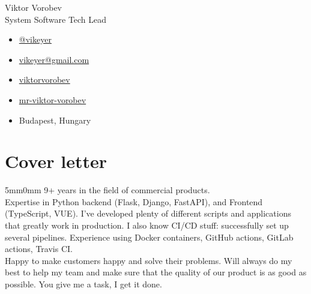 \documentclass[10pt]{article}
\newcommand{\lmvalue}{5mm}
\newcommand{\rmvalue}{0mm}
\begin{document}
\begin{minipage}[b]{0.78\linewidth}
	{\fontsize{28pt}{28pt}\selectfont Viktor Vorobev}
	\\[1em]
	{\color{gray}\fontsize{16pt}{16pt}\selectfont System Software Tech Lead}
\end{minipage}
\hfill%
\begin{minipage}[b]{0.24\linewidth}
	\begin{flushleft}
		\begin{itemize}
			\item[\color{cyan}\faPaperPlane] \href{https://t.me/vikeyer}{@vikeyer}
			\item[\color{cyan}\faEnvelope] \href{mailto:vikeyer@gmail.com}{vikeyer@gmail.com}
			\item[\color{cyan}\faGithub] \href{https://github.com/viktorvorobev}{viktorvorobev}
			\item[\color{cyan}\faLinkedin] \href{https://www.linkedin.com/in/mr-viktor-vorobev/}{mr-viktor-vorobev}
			\item[\faBuildingO] Budapest, Hungary
		\end{itemize}
	\end{flushleft}
\end{minipage}
\vspace{3mm}
\section*{Cover letter}
\begin{changemargin}{\lmvalue}{\rmvalue}
	9+ years in the field of commercial products. \\
	Expertise in Python backend (Flask, Django, FastAPI), and Frontend (TypeScript, VUE).
	I've developed plenty of different scripts and applications that greatly work in production.
	I also know CI/CD stuff: successfully set up several pipelines.
	Experience using Docker containers, GitHub actions, GitLab actions, Travis CI. \\
	Happy to make customers happy and solve their problems.
	Will always do my best to help my team and make sure that the quality of our product is as good as possible.
	You give me a task, I get it done.
\end{changemargin}
\end{document}
